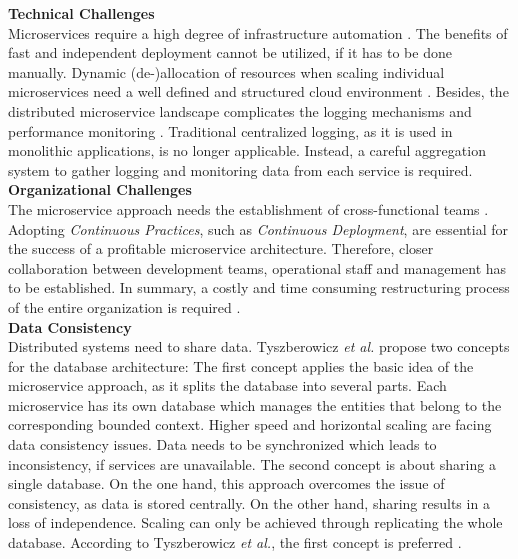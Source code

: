 \noindent
\textbf{Technical Challenges}\\
Microservices require a high degree of infrastructure automation \cite{MigratingTowardsSurvey}. The benefits of fast and independent deployment cannot be utilized, if it has to be done manually. Dynamic (de-)allocation of resources when scaling individual microservices need a well defined and structured cloud environment \cite{MigratingCloud}. 
Besides, the distributed microservice landscape complicates the logging mechanisms and performance monitoring \cite{SystematicMappingStudyMicroservice}. Traditional centralized logging, as it is used in monolithic applications, is no longer applicable. Instead, a careful aggregation system to gather logging and monitoring data from each service is required.\\

\noindent
\textbf{Organizational Challenges}\\
The microservice approach needs the establishment of cross-functional teams \cite{Fowler}. Adopting \textit{Continuous Practices}, such as \textit{Continuous Deployment}, are essential for the success of a profitable microservice architecture. Therefore, closer collaboration between development teams, operational staff and management has to be established. In summary, a costly and time consuming restructuring process of the entire organization is required \cite{NikoProseminar}. \\



\noindent
\textbf{Data Consistency}\\
Distributed systems need to share data. Tyszberowicz \textit{et al.} propose two concepts for the database architecture: The first concept applies the basic idea of the microservice approach, as it splits the database into several parts. Each microservice has its own database which manages the entities that belong to the corresponding bounded context. Higher speed and horizontal scaling are facing data consistency issues. Data needs to be synchronized which leads to inconsistency, if services are unavailable. The second concept is about sharing a single database. On the one hand, this approach overcomes the issue of consistency, as data is stored centrally. On the other hand, sharing results in a loss of independence. Scaling can only be achieved through replicating the whole database. According to Tyszberowicz \textit{et al.}, the first concept is preferred \cite{FunctionalDecompositionHeinrich}. \\




